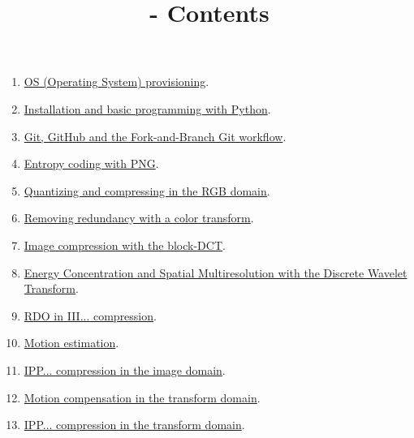 
\title{\SM - Contents}

\maketitle

\begin{enumerate}
\item \href{https://sistemas-multimedia.github.io/milestones/01-provisioning/}{OS (Operating System) provisioning}.
\item \href{https://sistemas-multimedia.github.io/milestones/02-python/}{Installation and basic programming with Python}.
\item \href{https://sistemas-multimedia.github.io/milestones/03-git/}{Git, GitHub and the Fork-and-Branch Git workflow}.
\item \href{https://sistemas-multimedia.github.io/milestones/04-PNG/}{Entropy coding with PNG}.
\item \href{https://sistemas-multimedia.github.io/milestones/05-RGB_compression/}{Quantizing and compressing in the RGB domain}.
\item \href{https://sistemas-multimedia.github.io/milestones/06-YUV_compression/}{Removing redundancy with a color transform}.
\item \href{https://sistemas-multimedia.github.io/milestones/07-DCT/}{Image compression with the block-DCT}.
\item \href{https://sistemas-multimedia.github.io/milestones/08-DWT/}{Energy Concentration and Spatial Multiresolution with the Discrete Wavelet Transform}.
\item \href{https://sistemas-multimedia.github.io/milestones/09-III_coding/}{RDO in III... compression}.
\item \href{https://sistemas-multimedia.github.io/milestones/10-ME/}{Motion estimation}.
\item \href{https://sistemas-multimedia.github.io/milestones/11-image_domain_IPP/}{IPP... compression in the image domain}.
\item \href{https://sistemas-multimedia.github.io/milestones/12-transform_domain_MC/}{Motion compensation in the transform domain}.
\item \href{https://sistemas-multimedia.github.io/milestones/13-transform_domain_IPP/}{IPP... compression in the transform domain}.

\end{enumerate}
